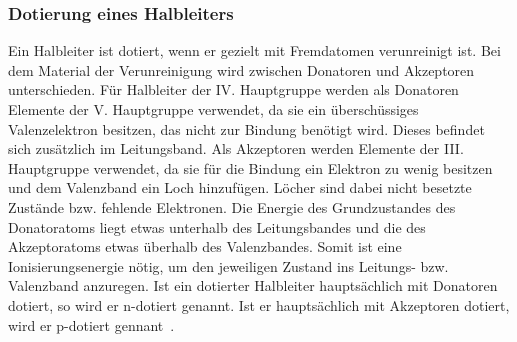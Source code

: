     \subsubsection{Dotierung eines Halbleiters}
        Ein Halbleiter ist dotiert, wenn er gezielt mit Fremdatomen verunreinigt ist. 
        Bei dem Material der Verunreinigung wird zwischen Donatoren und Akzeptoren unterschieden. 
        Für Halbleiter der IV. Hauptgruppe werden als Donatoren Elemente der V. Hauptgruppe verwendet, da sie ein überschüssiges Valenzelektron besitzen, das nicht zur Bindung benötigt wird. 
        Dieses befindet sich zusätzlich im Leitungsband. Als Akzeptoren werden Elemente der III. Hauptgruppe verwendet, da sie für die Bindung ein Elektron zu wenig besitzen und dem Valenzband ein Loch hinzufügen. 
        Löcher sind dabei nicht besetzte Zustände bzw. fehlende Elektronen. 
        Die Energie des Grundzustandes des Donatoratoms liegt etwas unterhalb des Leitungsbandes und die des Akzeptoratoms etwas überhalb des Valenzbandes. 
        Somit ist eine Ionisierungsenergie nötig, um den jeweiligen Zustand ins Leitungs- bzw. Valenzband anzuregen.
        Ist ein dotierter Halbleiter hauptsächlich mit Donatoren dotiert, so wird er n-dotiert genannt. 
        Ist er hauptsächlich mit Akzeptoren dotiert, wird er p-dotiert gennant~\cite[503-506]{gross_marx_2022}.
